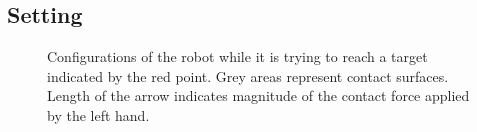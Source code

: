 \subsection{Setting}\label{sec.force_setting}

\begin{figure}[!htb]
    \begin{minipage}[t]{0.49\textwidth}
    \end{minipage}
    \hfill
    \begin{minipage}[t]{0.49\textwidth}
    \end{minipage}
    \begin{minipage}[t]{0.49\textwidth}
    \end{minipage}
    \hfill
    \begin{minipage}[t]{0.49\textwidth}
    \end{minipage}
    \begin{minipage}[t]{0.49\textwidth}
    \end{minipage}
    \hfill
    \begin{minipage}[t]{0.49\textwidth}
    \end{minipage}
    \caption[Prioritization of the contact forces: reaching task.]{
        Configurations of the robot while it is trying to reach a target
        indicated by the red point. Grey areas represent contact surfaces.
        Length of the arrow indicates magnitude of the contact force applied by
        the left hand.
    }
    \label{fig.force_distrib}
\end{figure}


